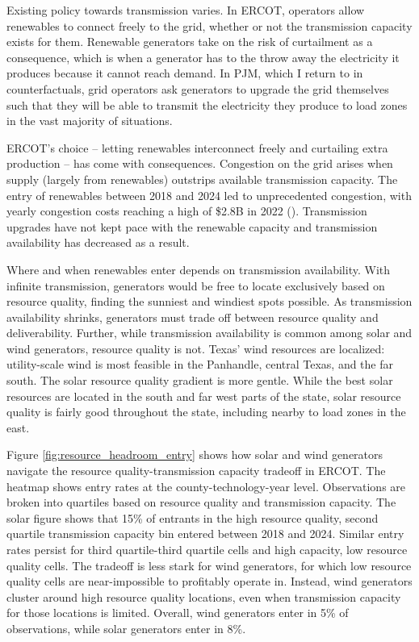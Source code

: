 \documentclass[12pt]{article}
\begin{document}
Existing policy towards transmission varies. In ERCOT, operators allow renewables to connect freely to the grid, whether or not the transmission capacity exists for them. Renewable generators take on the risk of curtailment as a consequence, which is when a generator has to the throw away the electricity it produces because it cannot reach demand. In PJM, which I return to in counterfactuals, grid operators ask generators to upgrade the grid themselves such that they will be able to transmit the electricity they produce to load zones in the vast majority of situations. 

ERCOT's choice -- letting renewables interconnect freely and curtailing extra production -- has come with consequences. Congestion on the grid arises when supply (largely from renewables) outstrips available transmission capacity. The entry of renewables between 2018 and 2024 led to unprecedented congestion, with yearly congestion costs reaching a high of \$2.8B in 2022 (\cite{PotomacEconomics2023}). Transmission upgrades have not kept pace with the renewable capacity and transmission availability has decreased as a result.

Where and when renewables enter depends on transmission availability. With infinite transmission, generators would be free to locate exclusively based on resource quality, finding the sunniest and windiest spots possible. As transmission availability shrinks, generators must trade off between resource quality and deliverability. Further, while transmission availability is common among solar and wind generators, resource quality is not. Texas' wind resources are localized: utility-scale wind is most feasible in the Panhandle, central Texas, and the far south. The solar resource quality gradient is more gentle. While the best solar resources are located in the south and far west parts of the state, solar resource quality is fairly good throughout the state, including nearby to load zones in the east.

Figure \ref{fig:resource_headroom_entry} shows how solar and wind generators navigate the resource quality-transmission capacity tradeoff in ERCOT. The heatmap shows entry rates at the county-technology-year level. Observations are broken into quartiles based on resource quality and transmission capacity. The solar figure shows that 15\% of entrants in the high resource quality, second quartile transmission capacity bin entered between 2018 and 2024. Similar entry rates persist for third quartile-third quartile cells and high capacity, low resource quality cells. The tradeoff is less stark for wind generators, for which low resource quality cells are near-impossible to profitably operate in. Instead, wind generators cluster around high resource quality locations, even when transmission capacity for those locations is limited. Overall, wind generators enter in 5\% of observations, while solar generators enter in 8\%.
\end{document}
